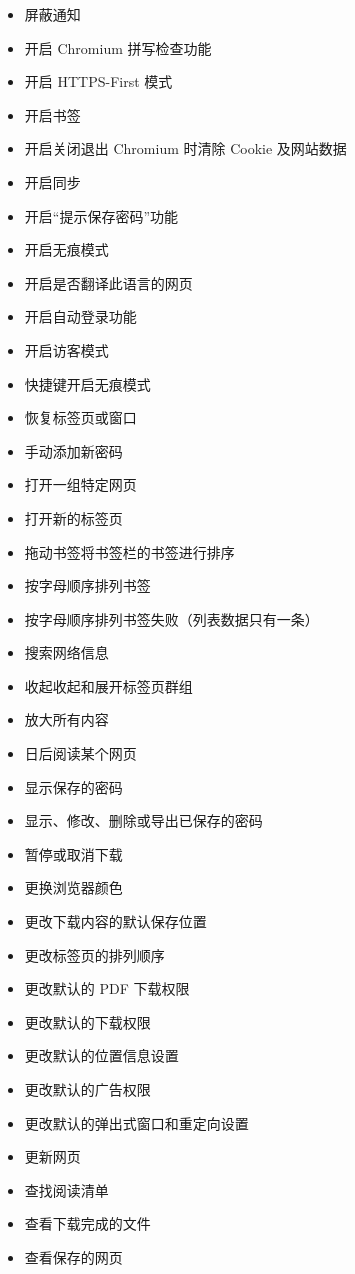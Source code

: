 \documentclass{article}
\begin{document}
\begin{itemize}
    \item 屏蔽通知
    \item 开启 Chromium 拼写检查功能
    \item 开启 HTTPS-First 模式
    \item 开启书签
    \item 开启关闭退出 Chromium 时清除 Cookie 及网站数据
    \item 开启同步
    \item 开启“提示保存密码”功能
    \item 开启无痕模式
    \item 开启是否翻译此语言的网页
    \item 开启自动登录功能
    \item 开启访客模式
    \item 快捷键开启无痕模式
    \item 恢复标签页或窗口
    \item 手动添加新密码
    \item 打开一组特定网页
    \item 打开新的标签页
    \item 拖动书签将书签栏的书签进行排序
    \item 按字母顺序排列书签
    \item 按字母顺序排列书签失败（列表数据只有一条）
    \item 搜索网络信息
    \item 收起收起和展开标签页群组
    \item 放大所有内容
    \item 日后阅读某个网页
    \item 显示保存的密码
    \item 显示、修改、删除或导出已保存的密码
    \item 暂停或取消下载
    \item 更换浏览器颜色
    \item 更改下载内容的默认保存位置
    \item 更改标签页的排列顺序
    \item 更改默认的 PDF 下载权限
    \item 更改默认的下载权限
    \item 更改默认的位置信息设置
    \item 更改默认的广告权限
    \item 更改默认的弹出式窗口和重定向设置
    \item 更新网页
    \item 查找阅读清单
    \item 查看下载完成的文件
    \item 查看保存的网页

\end{itemize}
\end{document}
